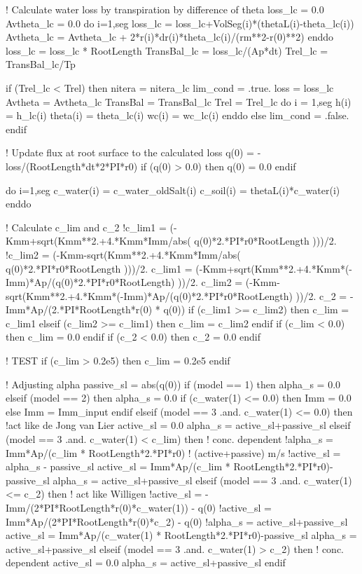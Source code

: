     ! Calculate water loss by transpiration by difference of theta
    loss_lc = 0.0
    Avtheta_lc = 0.0
    do i=1,seg
      loss_lc = loss_lc+VolSeg(i)*(thetaL(i)-theta_lc(i))
      Avtheta_lc = Avtheta_lc + 2*r(i)*dr(i)*theta_lc(i)/(rm**2-r(0)**2)
    enddo
    loss_lc = loss_lc * RootLength
    TransBal_lc = loss_lc/(Ap*dt)
    Trel_lc = TransBal_lc/Tp

    if (Trel_lc < Trel) then
      nitera = nitera_lc
      lim_cond = .true.
      loss = loss_lc
      Avtheta = Avtheta_lc
      TransBal = TransBal_lc
      Trel = Trel_lc
      do i = 1,seg
        h(i) = h_lc(i)
        theta(i) = theta_lc(i)
        wc(i) = wc_lc(i)
      enddo
    else
      lim_cond = .false.
    endif


    ! Update flux at root surface to the calculated loss
    q(0) = -loss/(RootLength*dt*2*PI*r0)
    if (q(0) > 0.0) then
      q(0) = 0.0
    endif

        
    do i=1,seg
      c_water(i) = c_water_oldSalt(i)
      c_soil(i) = thetaL(i)*c_water(i)
    enddo

    ! Calculate c_lim and c_2
    !c_lim1 = (-Kmm+sqrt(Kmm**2.+4.*Kmm*Imm/abs( q(0)*2.*PI*r0*RootLength )))/2.
    !c_lim2 = (-Kmm-sqrt(Kmm**2.+4.*Kmm*Imm/abs( q(0)*2.*PI*r0*RootLength )))/2.
    c_lim1 = (-Kmm+sqrt(Kmm**2.+4.*Kmm*(-Imm)*Ap/(q(0)*2.*PI*r0*RootLength) ))/2.
    c_lim2 = (-Kmm-sqrt(Kmm**2.+4.*Kmm*(-Imm)*Ap/(q(0)*2.*PI*r0*RootLength) ))/2.
    c_2 = -Imm*Ap/(2.*PI*RootLength*r(0) * q(0))
    if (c_lim1 >= c_lim2) then
      c_lim = c_lim1
    elseif (c_lim2 >= c_lim1) then
      c_lim = c_lim2
    endif
    if (c_lim < 0.0) then
      c_lim = 0.0
    endif
    if (c_2 < 0.0) then
      c_2 = 0.0
    endif

    ! TEST
    if (c_lim > 0.2e5) then
      c_lim = 0.2e5
    endif

    ! Adjusting alpha
    passive_sl = abs(q(0))
    if (model == 1) then
      alpha_s = 0.0
    elseif (model == 2) then
      alpha_s = 0.0
      if (c_water(1) <= 0.0) then
        Imm = 0.0
      else
        Imm = Imm_input
      endif
    elseif (model == 3 .and. c_water(1) <= 0.0) then 	!act like de Jong van Lier
      active_sl = 0.0
      alpha_s = active_sl+passive_sl
    elseif (model == 3 .and. c_water(1) < c_lim) then	! conc. dependent
      !alpha_s = Imm*Ap/(c_lim * RootLength*2.*PI*r0)	! (active+passive) m/s
      !active_sl = alpha_s - passive_sl
      active_sl = Imm*Ap/(c_lim * RootLength*2.*PI*r0)-passive_sl
      alpha_s = active_sl+passive_sl
    elseif (model == 3 .and. c_water(1) <= c_2) then	! act like Willigen
      !active_sl = -Imm/(2*PI*RootLength*r(0)*c_water(1)) - q(0)
      !active_sl = Imm*Ap/(2*PI*RootLength*r(0)*c_2) - q(0)
      !alpha_s = active_sl+passive_sl
      active_sl = Imm*Ap/(c_water(1) * RootLength*2.*PI*r0)-passive_sl
      alpha_s = active_sl+passive_sl
    elseif (model == 3 .and. c_water(1) > c_2) then 	! conc. dependent
      active_sl = 0.0
      alpha_s = active_sl+passive_sl
    endif 

